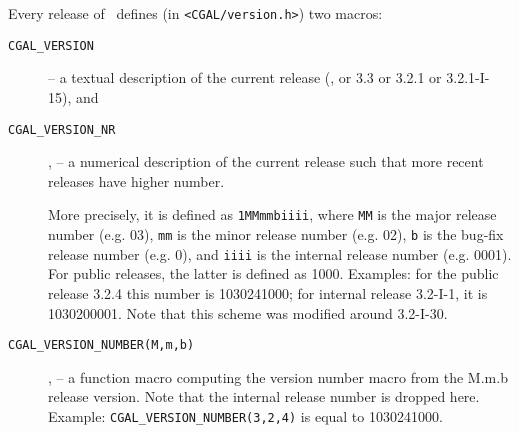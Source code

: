 Every release of \cgal\ defines (in \texttt{<CGAL/version.h>}) two
macros:
\begin{description}
\item[\texttt{CGAL\_VERSION}]
     -- a textual description of the current release
        (\eg, or 3.3 or 3.2.1 or 3.2.1-I-15), and 
\item[\texttt{CGAL\_VERSION\_NR}], 
     -- a numerical description of the current release such that
        more recent releases have higher number.

     More precisely, it is defined as \texttt{1MMmmbiiii},
     where \texttt{MM} is the major release number (e.g. 03),
     \texttt{mm} is the minor release number (e.g. 02),
     \texttt{b} is the bug-fix release number (e.g. 0), and
     \texttt{iiii} is the internal release number (e.g. 0001). For
     public releases, the latter is defined as 1000.
     Examples: for the public release 3.2.4 this number is 
     1030241000; for internal release 3.2-I-1, it is 1030200001.
     Note that this scheme was modified around 3.2-I-30.
\item[\texttt{CGAL\_VERSION\_NUMBER(M,m,b)}], 
     -- a function macro computing the version number macro
     from the M.m.b release version.  Note that the internal release
     number is dropped here.  Example: \texttt{CGAL\_VERSION\_NUMBER(3,2,4)}
     is equal to 1030241000.
\end{description}
 


